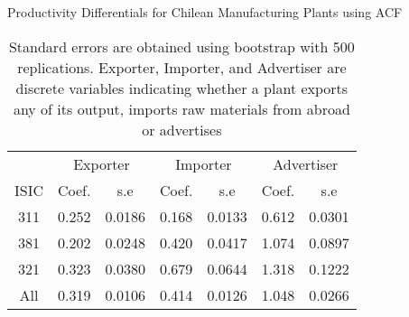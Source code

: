 \documentclass[11pt]{article}
\begin{document}
\begin{table}[H]
\centering
\caption{Productivity Differentials for Chilean Manufacturing Plants using ACF}
\begin{tabular}{ccccccc}
  \hline\hline & \multicolumn{2}{c}{Exporter}  & \multicolumn{2}{c}{Importer} & \multicolumn{2}{c}{Advertiser} \\ \cmidrule(lr){2-3} \cmidrule(lr){4-5} \cmidrule(lr){6-7}ISIC & Coef. & s.e & Coef. & s.e & Coef. & s.e \\ 
  \hline
311 & 0.252 & 0.0186 & 0.168 & 0.0133 & 0.612 & 0.0301 \\ 
  381 & 0.202 & 0.0248 & 0.420 & 0.0417 & 1.074 & 0.0897 \\ 
  321 & 0.323 & 0.0380 & 0.679 & 0.0644 & 1.318 & 0.1222 \\ 
  All & 0.319 & 0.0106 & 0.414 & 0.0126 & 1.048 & 0.0266 \\ 
   \hline
\end{tabular}
\caption*{Standard errors are obtained using bootstrap with 500 replications. Exporter, Importer, and Advertiser are discrete variables indicating whether a plant exports any of its output, imports raw materials from abroad or advertises}
\end{table}
\end{document}
